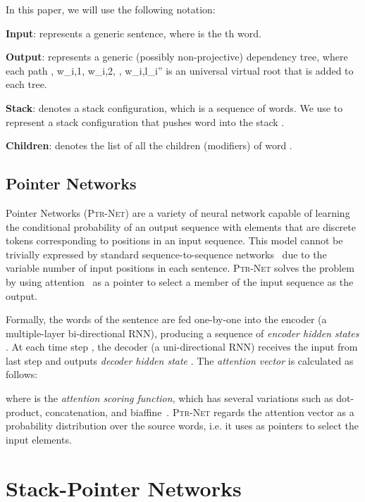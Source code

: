 \documentclass[11pt,a4paper]{article}
\begin{document}
In this paper, we will use the following notation: 

\textbf{Input}:  represents 
a generic sentence, where  is the th word.

\textbf{Output}:  represents a generic (possibly non-projective) dependency tree, where each path , w_{i,1}, w_{i,2}, \cdots, w_{i,l_i}'' is an universal virtual root that is added to each tree.

\textbf{Stack}:  denotes a stack configuration, which is a sequence of words. We use  to represent a stack configuration that pushes word  into the stack .

\textbf{Children}:  denotes the list of all the children (modifiers) of word .

\subsection{Pointer Networks}\label{subsec:ptr}
Pointer Networks (\textsc{Ptr-Net}) \citep{vinyals2015pointer} are a variety of neural network capable of learning the conditional probability of an output sequence with elements that are discrete tokens corresponding to positions in an input sequence.
This model cannot be trivially expressed by standard sequence-to-sequence networks~\citep{sutskever2014sequence} due to the variable number of input positions in each sentence. 
\textsc{Ptr-Net} solves the problem by using attention~\citep{bahdanau2015,luong-pham-manning:2015:EMNLP} as a pointer to select a member of the input sequence as the output.

Formally, the words of the sentence  are fed one-by-one into the encoder (a multiple-layer bi-directional RNN), producing a sequence of \emph{encoder hidden states }. 
At each time step , the decoder (a uni-directional RNN) receives the input from last step and outputs \emph{decoder hidden state }. 
The \emph{attention vector } is calculated as follows: 

where  is the \emph{attention scoring function}, which has several variations such as dot-product, concatenation, and biaffine~\citep{luong-pham-manning:2015:EMNLP}. 
\textsc{Ptr-Net} regards the attention vector  as a probability distribution over the source words, i.e. it uses  as pointers to select the input elements.

\section{Stack-Pointer Networks}
\label{subsec:stackptr}
\end{document}
